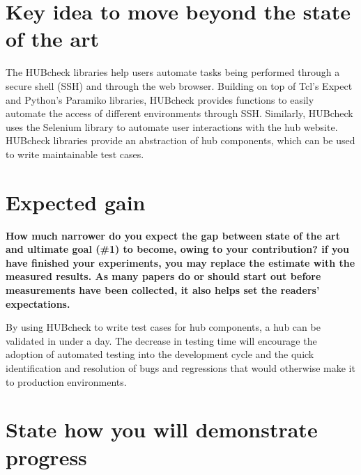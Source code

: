 \documentclass[letterpaper]{article}
\begin{document}
\section{Key idea to move beyond the state of the art}

\textbf{
}

The HUBcheck libraries help users automate tasks being performed through a
secure shell (SSH) and through the web browser. Building on top of Tcl's Expect
and Python's Paramiko libraries, HUBcheck provides functions to easily automate
the access of different environments through SSH. Similarly, HUBcheck uses the
Selenium library to automate user interactions with the hub website. HUBcheck
libraries provide an abstraction of hub components, which can be used to write
maintainable test cases.



\section{Expected gain}

\textbf{
How much narrower do you expect the gap between state of the art and ultimate
goal (\#1) to become, owing to your contribution? if you have finished your
experiments, you may replace the estimate with the measured results. As many
papers do or should start out before measurements have been collected, it
also helps set the readers' expectations.
}

By using HUBcheck to write test cases for hub components, a hub can be
validated in under a day. The decrease in testing time will encourage the
adoption of automated testing into the development cycle and the quick
identification and resolution of bugs and regressions that would otherwise make
it to production environments.

\section{State how you will demonstrate progress}
\end{document}
